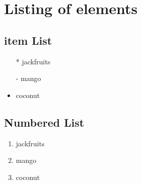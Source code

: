 \documentclass[12pt]{report}
\begin{document}
\section{Listing of elements}

\subsection{item List}

\begin{itemize}
\item[*] jackfruits
\item [-]mango
\item coconut
\end{itemize}
\subsection{Numbered List}

\begin{enumerate}[label=\alph*]
\item jackfruits
\item mango
\item coconut
\end{enumerate}
\end{document}
